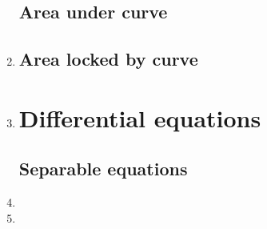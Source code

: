 \documentclass{article}
\begin{document}
\begin{enumerate}
\subsection{Area under curve}
\item 
\subsection{Area locked by curve}
\item 


\section{Differential equations}
\subsection{Separable equations}
\item 

\item 



\end{enumerate}
\end{document}
